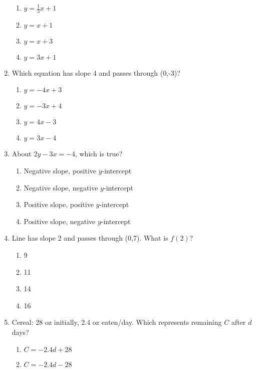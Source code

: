 \documentclass[12pt]{exam}
\begin{document}
\begin{enumerate}
\begin{center}
    \end{center}
    \begin{enumerate}[label=\Alph*)]
        \item $y = \frac{1}{3}x + 1$
        \item $y = x + 1$
        \item $y = x + 3$
        \item $y = 3x + 1$
    \end{enumerate}
    \item Which equation has slope 4 and passes through (0,-3)?
    \begin{enumerate}[label=\Alph*)]
        \item $y = -4x + 3$
        \item $y = -3x + 4$
        \item $y = 4x - 3$
        \item $y = 3x - 4$
    \end{enumerate}
    \item About $2y - 3x = -4$, which is true?
    \begin{enumerate}[label=\Alph*)]
        \item Negative slope, positive $y$-intercept
        \item Negative slope, negative $y$-intercept
        \item Positive slope, positive $y$-intercept
        \item Positive slope, negative $y$-intercept
    \end{enumerate}
    \item Line has slope 2 and passes through (0,7). What is $f(2)$?
    \begin{enumerate}[label=\Alph*)]
        \item 9
        \item 11
        \item 14
        \item 16
    \end{enumerate}
    \item Cereal: 28 oz initially, 2.4 oz eaten/day. Which represents remaining $C$ after $d$ days?
    \begin{enumerate}[label=\Alph*)]
        \item $C = -2.4d + 28$
        \item $C = -2.4d - 28$

\end{enumerate}
\end{enumerate}
\end{document}
